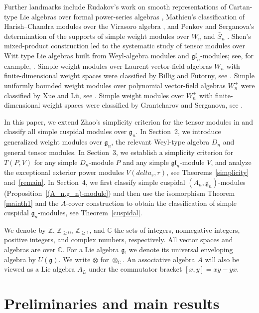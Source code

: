 \documentclass[12pt,a4paper]{amsart}
\def\mg{g}%
\def\gl{gl}%
\def\delta{delta}%
\numberwithin{equation}{section}
\newcommand{\C}{\mathbb C}
\newcommand{\Z}{\mathbb{Z}}
\def\mg{\mathfrak{g}}
\def\gl{\mathfrak{gl}}
\begin{document}
Further landmarks include Rudakov's work on smooth representations of
Cartan-type Lie algebras over formal power-series algebras \cite{R1,R2},
Mathieu's classification of Harish--Chandra modules over the Virasoro
algebra \cite{M1}, and Penkov and Serganova's determination of the supports
of simple weight modules over \(W_n\) and \(\bar S_n\) \cite{PS}. Shen's
mixed-product construction \cite{Sh} led to the systematic study of tensor
modules over Witt type Lie algebras built from Weyl-algebra modules and \(\mathfrak{gl}_n\)-modules;
see, for example, \cite{LLZ}.
Simple  weight modules over Laurent
vector-field algebras $W_n$ with finite-dimensional weight spaces were classified by  Billig and Futorny, see \cite{BF1}.
Simple uniformly bounded weight modules over polynomial
vector-field algebras $W_n^+$ were classified by Xue and L\"u, see \cite{XL2}. Simple  weight modules over $W_n^+$ with finite-dimensional weight spaces were classified by  Grantcharov and Serganova, see \cite{GS}.

In this paper, we extend Zhao's simplicity criterion for the
tensor modules in \cite{Z} and classify all simple
cuspidal modules over \(\mathfrak g_n\). In Section~2, we introduce generalized weight modules over $\mg_n$,
the relevant
Weyl-type algebra $D_n$ and general tensor modules. In Section~3, we establish a
simplicity criterion for \(T(P,V)\) for any simple $D_n$-module $P$ and any simple $\gl_n$-module $V$, and analyze the exceptional exterior
power modules \(V(\delta_r,r)\), see Theorems~\ref{simplicity}
and~\ref{remain}. In Section~4, we first classify simple cuspidal
\((A_n,\mathfrak g_n)\)-modules (Proposition~\ref{(A_n,g_n)-module}) and
then use the isomorphism Theorem \ref{mainth1} and the \(A\)-cover construction to obtain the classification of
simple cuspidal \(\mathfrak g_n\)-modules, see Theorem~\ref{cuspidal}.

We denote by \(\Z\), \(\Z_{\geq0}\), \(\Z_{\geq1}\), and \(\C\) the
sets of integers, nonnegative integers, positive integers, and complex
numbers, respectively. All vector spaces and algebras are over \(\C\).
For a Lie algebra \(\mathfrak g\), we denote its universal enveloping
algebra by \(U(\mathfrak g)\). We write \(\otimes\) for
\(\otimes_{\mathbb C}\). An associative algebra \(A\) will also be
viewed as a Lie algebra \(A_L\) under the commutator bracket
\([x,y]=xy-yx\).







\section{Preliminaries and main results}
\end{document}
